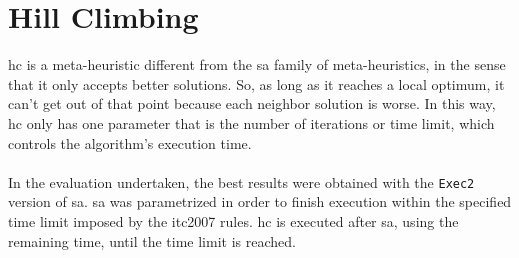 \section{Hill Climbing}
\label{sec:HillClimbing}

\gls{hc} is a meta-heuristic different from the \gls{sa} family of meta-heuristics, in the sense that it only accepts better solutions. So, as long as it reaches a local optimum, it can't get out of that point because each neighbor solution is worse. In this way, \gls{hc} only has one parameter that is the number of iterations or time limit, which controls the algorithm's execution time.\\
\\
In the evaluation undertaken, the best results were obtained with the \verb+Exec2+ version of \gls{sa}. \gls{sa} was parametrized in order to finish execution within the specified time limit imposed by the \gls{itc2007} rules. \gls{hc} is executed after \gls{sa}, using the remaining time, until the time limit is reached.

